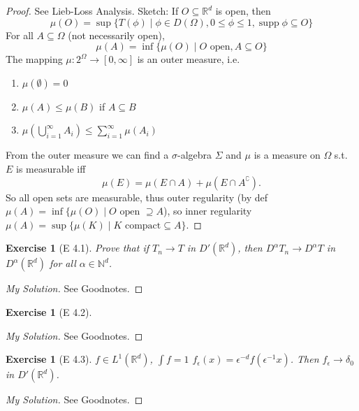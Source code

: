\documentclass{report}
\theoremstyle{tommy}
\newtheorem{ex}[defn]{Exercise}
\newcommand{\supp}{\operatorname{supp}}
\begin{document}
  \begin{proof}See Lieb-Loss Analysis. Sketch: If \(O \subseteq \mathbb{R}^d\) is open, then 
    \[\mu(O) = \sup \{T(\phi) \mid \phi \in D(\Omega), 0 \le \phi \le 1, \supp \phi \subseteq O\}\]
    For all \(A \subseteq \Omega\) (not necessarily open),
    \[\mu(A) = \inf \{\mu(O) \mid O \text{ open}, A \subseteq O\}\]
    The mapping \(\mu: 2^\Omega \to [0, \infty]\) is an outer measure, i.e.
    \begin{enumerate}
      \item \(\mu(\emptyset) = 0\)
      \item \(\mu(A) \le \mu(B)\) if \(A \subseteq B\)
      \item \(\mu \left(\bigcup_{i=1}^\infty A_i\right) \le \sum_{i=1}^\infty \mu(A_i)\)
    \end{enumerate}
    From the outer measure we can find a \(\sigma\)-algebra \(\Sigma\) and \(\mu\) is a measure on \(\Omega\) s.t. \(E\) is measurable iff \[\mu(E) = \mu(E \cap A) + \mu(E \cap A^\complement).\]
    So all open sets are measurable, thus outer regularity (by def \(\mu(A) = \inf\{\mu(O) \mid O \text{ open } \supseteq A\)), so inner regularity \(\mu(A) = \sup\{\mu(K) \mid K \text{ compact} \subseteq A\}\). 
  \end{proof}

  \begin{ex}[E 4.1]
    Prove that if \(T_n \to T\) in \(D'(\mathbb{R}^d)\), then \(D^\alpha T_n  \to D^\alpha T\) in \(D^\alpha(\mathbb{R}^d)\) for all \(\alpha \in \mathbb{N}^d\).
  \end{ex}

  \begin{proof}[My Solution]
    See Goodnotes.
  \end{proof}

  \begin{ex}[E 4.2]
  \end{ex}

  \begin{proof}[My Solution]
    See Goodnotes.
  \end{proof}

  \begin{ex}[E 4.3]
    \(f \in L^1(\mathbb{R}^d)\), \(\int f = 1\) \(f_\epsilon(x) = \epsilon^{-d} f(\epsilon^{-1}x)\). Then \(f_\epsilon \to \delta_0\) in \(D'(\mathbb{R}^d)\). 
  \end{ex}

  \begin{proof}[My Solution]
    See Goodnotes.
  \end{proof}
\end{document}
